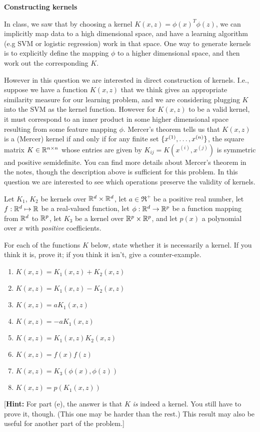 \item {} {\bf Constructing kernels}

In class, we saw that by choosing a kernel $K(x,z) = \phi(x)^T\phi(z)$, we can
implicitly map data to a high dimensional space, and have a learning algorithm (e.g SVM or logistic regression)
work in that space. One way to generate kernels is to explicitly define the
mapping $\phi$ to a higher dimensional space, and then work out the
corresponding $K$.

However in this question we are interested in direct construction of kernels.
I.e., suppose we have a function $K(x,z)$ that we think gives an appropriate
similarity measure for our learning problem, and we are considering plugging
$K$ into the SVM as the kernel function. However for $K(x,z)$ to be a valid
kernel, it must correspond to an inner product in some higher dimensional space
resulting from some feature mapping $\phi$.  Mercer's theorem tells us that
$K(x,z)$ is a (Mercer) kernel if and only if for any finite set $\{x^{(1)},
\ldots, x^{({n})}\}$, the square matrix $K \in {\mathbb R}^{{n} \times {n}}$ whose entries
are given by $K_{ij} = K(x^{(i)},x^{(j)})$ is symmetric and positive
semidefinite. You can find more details about Mercer's theorem in the notes,
though the description above is sufficient for this problem.
%
In this question we are interested to see which operations preserve the validity of kernels. 
%

Let $K_1$, $K_2$ be kernels over ${\mathbb R}^{{d}} \times
{\mathbb R}^{{d}}$, let $a \in \Re^+$ be a positive real number, let $f : {\mathbb R}^{{d}} \mapsto
{\mathbb R}$ be a real-valued function, let $\phi: {\mathbb R}^{{d}} \rightarrow {\mathbb R}^{p}$ be a
function mapping from ${\mathbb R}^{{d}}$ to ${\mathbb R}^{p}$, let $K_3$ be a kernel over ${\mathbb R}^{p}
\times {\mathbb R}^{p}$, and let $p(x)$ a polynomial over $x$ with \emph{positive}
coefficients.

For each of the functions $K$ below, state whether it is necessarily a
kernel.  If you think it is, prove it; if you think it isn't, give a
counter-example.

\begin{enumerate}

\item {} $K(x,z) = K_1(x,z) + K_2(x,z)$
\item {} $K(x,z) = K_1(x,z) - K_2(x,z)$
\item {} $K(x,z) = a K_1(x,z)$
\item {} $K(x,z) = -a K_1(x,z)$
\item {} $K(x,z) = K_1(x,z)K_2(x,z)$
\item {} $K(x,z) = f(x)f(z)$
\item {} $K(x,z) = K_3(\phi(x),\phi(z))$
\item {} $K(x,z) = p(K_1(x,z))$

\end{enumerate}

[\textbf{Hint:} For part (e), the answer is that $K$ \emph{is} indeed
a kernel. You still have to prove it, though.  (This one may be harder than the
rest.)  This result may also be useful for another part of the problem.]

\ifnum{} {
  
} \fi
